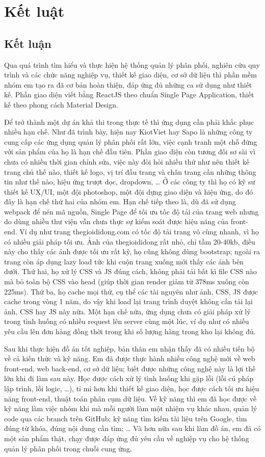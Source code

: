 \chapter{Kết luật}
\section{Kết luận}
Qua quá trình tìm hiểu và thực hiện hệ thống quản lý phân phối,
nghiên cứu quy trình và các chức năng nghiệp vụ, thiết kế giao
diện, cơ sở dữ liệu thì phần mềm nhóm em tạo ra đã cơ bản hoàn
thiện, đáp ứng đủ những ca sử dụng như thiết kế. Phần giao diện
viết bằng ReactJS theo chuẩn Single Page Application, thiết kế theo
phong cách Material Design. 

Để trở thành một dự án khả thi trong thực tế thì ứng dụng cần phải
khắc phục nhiều hạn chế. Như đã trình bày, hiện nay KiotViet hay Sapo
là những công ty cung cấp các ứng dụng quản lý phân phối rất lớn,
việc cạnh tranh một chỗ đứng với sản phẩm của họ là hạn chế đầu tiên.
Phần giao diện còn tương đối sơ sài vì chưa có nhiều thời gian chỉnh sửa,
việc này đòi hỏi nhiều thứ như nên thiết kế trang chủ thế nào,
thiết kế logo, vị trí đầu trang và chân trang cần những thông tin
như thế nào, hiệu ứng trượt dọc, dropdown, … Ở các công ty thì họ có
kỹ sư thiết kế UX/UI, một đội photoshop, một đội dựng giao diện
và hiệu ứng, do đó đây là hạn chế thứ hai của nhóm em. Hạn chế
tiếp theo là, dù đã sử dụng webpack để nén mã nguồn, Single Page
để tối ưu tốc độ tải của trang web nhưng do dùng nhiều thư viện
vẫn chưa thực sự kiểm soát được hiệu năng của front-end. Ví dụ
như trang thegioididong.com có tốc độ tải trang vô cùng nhanh,
vì họ có nhiều giải pháp tối ưu. Ảnh của thegioididong rất nhỏ,
chỉ tầm 20-40kb, điều này cho thấy các ảnh được tối ưu rất kỹ,
họ cũng không dùng bootstrap; ngoài ra trang còn áp dụng lazy load tức
khi cuộn trang xuống mới thấy các ảnh bên dưới. Thứ hai, họ xử lý
CSS và JS đúng cách, không phải tải bất kì file CSS nào mà bỏ toàn
bộ CSS vào head (giúp thời gian render giảm từ 378ms xuống còn 225ms).
Thứ ba, họ cache mọi thứ, cụ thể các tài nguyên như ảnh, CSS, JS
được cache trong vòng 1 năm, do vậy khi load lại trang trình
duyệt không cần tải lại ảnh, CSS hay JS này nữa. Một hạn
chế nữa, ứng dụng chưa có giải pháp xử lý trong tình huống có nhiều
request lên server cùng một lúc, ví dụ như có nhiều yêu cầu lên
đơn hàng đồng thời trong khi số lượng hàng trong kho lại không đủ.

Sau khi thực hiện đồ án tốt nghiệp, bản thân em nhận thấy đã có
nhiều tiến bộ về cả kiến thức và kỹ năng. Em đã được thực hành nhiều
công nghệ mới về web front-end, web back-end, cơ sở dữ liệu;
biết được những công nghệ này là lợi thế lớn khi đi làm sau này.
Học được cách xử lý tình huống khi gặp lỗi (lỗi cú pháp lập trình,
lỗi logic, …), tỉ mỉ hơn khi thiết kế giao diện, học được cách tối ưu
hiệu năng front-end, thuật toán phân cụm dữ liệu. Về kỹ năng thì
em đã học được về kỹ năng làm việc nhóm khi mà mỗi người làm một
nhiệm vụ khác nhau, quản lý code qua các branch trên GitHub;
kỹ năng tìm kiếm tài liệu trên Google, tìm đúng từ khóa,
đúng nội dung cần tìm; … Và hơn nữa sau khi làm đồ án, em đã có
một sản phẩm thật, chạy được đáp ứng đủ yêu cầu về nghiệp vụ
cho hệ thống quản lý phân phối trong chuỗi cung ứng.

